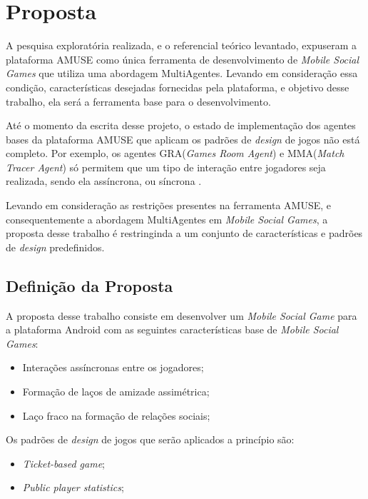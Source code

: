 \chapter[Proposta]{Proposta}

A pesquisa exploratória realizada, e o referencial teórico levantado, expuseram a
plataforma AMUSE como única ferramenta de desenvolvimento de \textit{Mobile Social Games}
que utiliza uma abordagem MultiAgentes. Levando em consideração essa condição,
características desejadas fornecidas pela plataforma, e objetivo desse trabalho, ela
será a ferramenta base para o desenvolvimento.

Até o momento da escrita desse projeto, o estado de implementação dos agentes bases da
plataforma AMUSE que aplicam os padrões de \textit{design} de jogos não está completo.
Por exemplo, os agentes GRA(\textit{Games Room Agent}) e MMA(\textit{Match Tracer Agent})
só permitem que um tipo de interação entre jogadores seja realizada,
sendo ela assíncrona, ou síncrona \cite{bergenti2013}.

Levando em consideração as restrições presentes na ferramenta AMUSE, e consequentemente a
abordagem MultiAgentes em \textit{Mobile Social Games}, a proposta desse trabalho
é restringinda a um conjunto de características e padrões de \textit{design} predefinidos.

\section{Definição da Proposta}

A proposta desse trabalho consiste em desenvolver um \textit{Mobile Social Game} para a
plataforma Android com as seguintes características base de \textit{Mobile Social Games}:

\begin{itemize}
  \item Interações assíncronas entre os jogadores;
  \item Formação de laços de amizade assimétrica;
  \item Laço fraco na formação de relações sociais;
\end{itemize}

Os padrões de \textit{design} de jogos que serão aplicados a princípio são:

\begin{itemize}
  \item \textit{Ticket-based game};
  \item \textit{Public player statistics};
\end{itemize}

